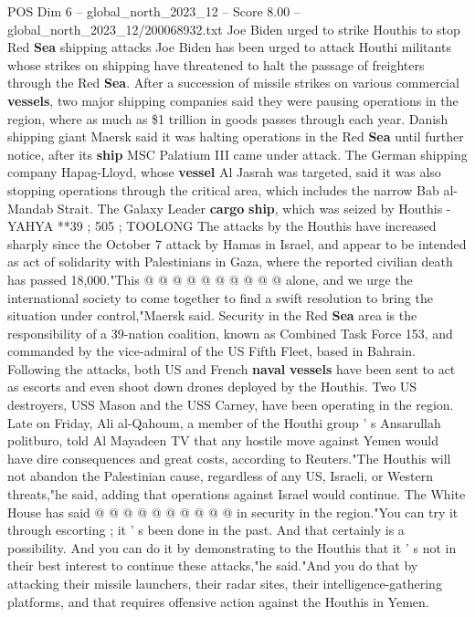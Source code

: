 \begin{textsample}{POS Dim 6 – global\_north\_2023\_12 – Score 8.00 – global\_north\_2023\_12/200068932.txt}  \label{ex:f6_pos_185}
Joe Biden urged to strike Houthis to stop Red \textbf{Sea} shipping attacks Joe Biden has been urged to attack Houthi militants whose strikes on shipping have threatened to halt the passage of freighters through the Red \textbf{Sea}.
After a succession of missile strikes on various commercial \textbf{vessels}, two major shipping companies said they were pausing operations in the region, where as much as \$1 trillion in goods passes through each year.
Danish shipping giant Maersk said it was halting operations in the Red \textbf{Sea} until further notice, after its \textbf{ship} MSC Palatium III came under attack.
The German shipping company Hapag-Lloyd, whose \textbf{vessel} Al Jasrah was targeted, said it was also stopping operations through the critical area, which includes the narrow Bab al-Mandab Strait.
The Galaxy Leader \textbf{cargo} \textbf{ship}, which was seized by Houthis - YAHYA **39 ; 505 ; TOOLONG The attacks by the Houthis have increased sharply since the October 7 attack by Hamas in Israel, and appear to be intended as act of solidarity with Palestinians in Gaza, where the reported civilian death has passed 18,000."This @ @ @ @ @ @ @ @ @ @ alone, and we urge the international society to come together to find a swift resolution to bring the situation under control,"Maersk said.
Security in the Red \textbf{Sea} area is the responsibility of a 39-nation coalition, known as Combined Task Force 153, and commanded by the vice-admiral of the US Fifth Fleet, based in Bahrain.
Following the attacks, both US and French \textbf{naval} \textbf{vessels} have been sent to act as escorts and even shoot down drones deployed by the Houthis.
Two US destroyers, USS Mason and the USS Carney, have been operating in the region.
Late on Friday, Ali al-Qahoum, a member of the Houthi group ' s Ansarullah politburo, told Al Mayadeen TV that any hostile move against Yemen would have dire consequences and great costs, according to Reuters."The Houthis will not abandon the Palestinian cause, regardless of any US, Israeli, or Western threats,"he said, adding that operations against Israel would continue.
The White House has said @ @ @ @ @ @ @ @ @ @ in security in the region."You can try it through escorting ; it ' s been done in the past.
And that certainly is a possibility.
And you can do it by demonstrating to the Houthis that it ' s not in their best interest to continue these attacks,"he said."And you do that by attacking their missile launchers, their radar sites, their intelligence-gathering platforms, and that requires offensive action against the Houthis in Yemen.

\end{textsample}
